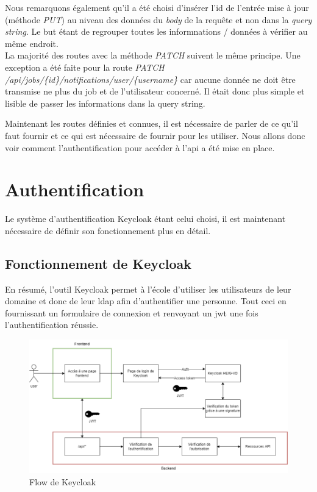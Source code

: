 \documentclass[
    iai, %
    il, %
]{heig-tb}
\begin{document}
Nous remarquons également qu'il a été choisi d'insérer l'id de l'entrée mise à jour (méthode \emph{PUT}) au niveau des données du \emph{body} de la requête et non dans la \emph{query string}. Le but étant de regrouper toutes les informnations / données à vérifier au même endroit. \\
La majorité des routes avec la méthode \emph{PATCH} suivent le même principe. Une exception a été faite pour la route \emph{PATCH /api/jobs/\{id\}/notifications/user/\{username\}} car aucune donnée ne doit être transmise ne plus du job et de l'utilisateur concerné. Il était donc plus simple et lisible de passer les informations dans la query string.

Maintenant les routes définies et connues, il est nécessaire de parler de ce qu'il faut fournir et ce qui est nécessaire de fournir pour les utiliser. Nous allons donc voir comment l'authentification pour accéder à l'\Gls{api} a été mise en place.

\section{Authentification}
Le système d'authentification Keycloak étant celui choisi, il est maintenant nécessaire de définir son fonctionnement plus en détail.

\subsection{Fonctionnement de Keycloak}
En résumé, l'outil Keycloak permet à l'école d'utiliser les utilisateurs de leur domaine et donc de leur \Gls{ldap} afin d'authentifier une personne. Tout ceci en fournissant un formulaire de connexion et renvoyant un \Gls{jwt} une fois l'authentification réussie.

\begin{center}
    \begin{figure}[H]
        \includegraphics[width=\textwidth]{./assets/figures/keycloak-flow.drawio.png}
        \caption{Flow de Keycloak \label{keycloak-flow.drawio}}
    \end{figure}
\end{center}
\end{document}
